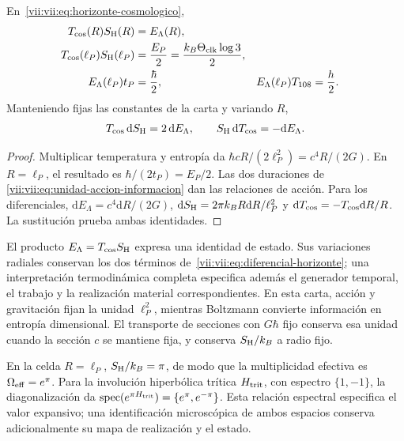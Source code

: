 \begin{theorem}
\label{vii:vii:thm:celda-media-accion}
En~\eqref{vii:vii:eq:horizonte-cosmologico},
\begin{align}
 T_{\rm cos}(R)S_{\rm H}(R)&=E_\Lambda(R),\\
 T_{\rm cos}(\ell_P)S_{\rm H}(\ell_P)
 &=\frac{E_P}{2}=\frac{k_B\Theta_{\rm clk}\log3}{2},\\
 E_\Lambda(\ell_P)t_P&=\frac{\hbar}{2},&
 E_\Lambda(\ell_P)T_{108}&=\frac h2.
 \label{vii:vii:eq:media-accion-horizonte}
\end{align}
Manteniendo fijas las constantes de la carta y variando \(R\),
\begin{equation}
 T_{\rm cos}\,\mathrm dS_{\rm H}=2\,\mathrm dE_\Lambda,
 \qquad S_{\rm H}\,\mathrm dT_{\rm cos}=-\mathrm dE_\Lambda.
 \label{vii:vii:eq:diferencial-horizonte}
\end{equation}
\end{theorem}
\begin{proof}
Multiplicar temperatura y entropía da
\(\hbar cR/(2\ell_P^2)=c^4R/(2G)\).
En \(R=\ell_P\), el resultado es
\(\hbar/(2t_P)=E_P/2\). Las dos duraciones de
\eqref{vii:vii:eq:unidad-accion-informacion} dan las relaciones de acción.
Para los diferenciales,
\(\mathrm dE_\Lambda=c^4\mathrm dR/(2G)\),
\(\mathrm dS_{\rm H}=2\pi k_BR\mathrm dR/\ell_P^2\) y
\(\mathrm dT_{\rm cos}=-T_{\rm cos}\mathrm dR/R\).
La sustitución prueba ambas identidades.
\end{proof}

El producto \(E_\Lambda=T_{\rm cos}S_{\rm H}\) expresa una
identidad de estado. Sus variaciones radiales conservan los dos términos
de~\eqref{vii:vii:eq:diferencial-horizonte}; una interpretación termodinámica
completa especifica además el generador temporal, el trabajo y la
realización material correspondientes. En esta carta, acción y
gravitación fijan la unidad \(\ell_P^2\), mientras Boltzmann convierte
información en entropía dimensional. El transporte de secciones con
\(G\hbar\) fijo conserva esa unidad cuando la sección \(c\) se
mantiene fija, y conserva \(S_{\rm H}/k_B\) a radio fijo.

En la celda \(R=\ell_P\), \(S_{\rm H}/k_B=\pi\), de modo que
la multiplicidad efectiva es \(\Omega_{\rm eff}=e^\pi\).
Para la involución hiperbólica trítica \(H_{\rm trit}\), con espectro
\(\{1,-1\}\), la diagonalización da
\(\operatorname{spec}(e^{\pi H_{\rm trit}})=\{e^\pi,e^{-\pi}\}\).
Esta relación espectral especifica el valor expansivo; una identificación
microscópica de ambos espacios conserva adicionalmente su mapa de
realización y el estado.

